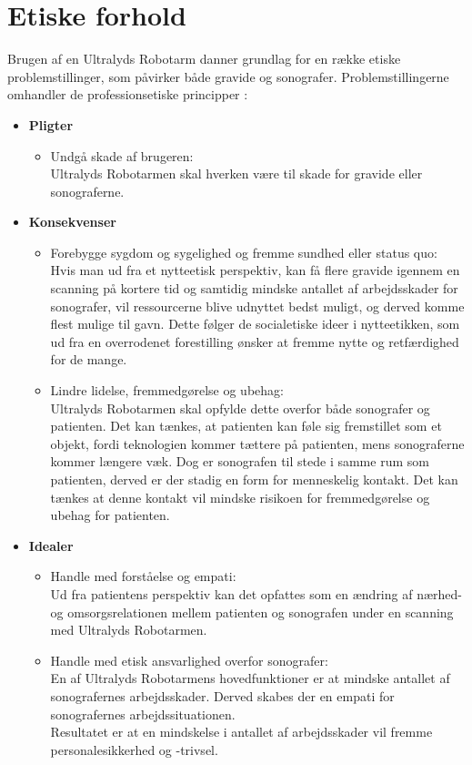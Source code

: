 \section{Etiske forhold}
Brugen af en Ultralyds Robotarm danner grundlag for en række etiske problemstillinger, som påvirker både gravide og sonografer. 
Problemstillingerne omhandler de professionsetiske principper \cite{Husted}: 
\begin{itemize}
	\item \textbf{Pligter}
	\begin{itemize}
		\item Undgå skade af brugeren:\\ 
		Ultralyds Robotarmen skal hverken være til skade for gravide eller sonograferne. 
	\end{itemize} 
	\item \textbf{Konsekvenser}
	\begin{itemize}
		\item Forebygge sygdom og sygelighed og fremme sundhed eller status quo: \\
		Hvis man ud fra et nytteetisk perspektiv, kan få flere gravide igennem en scanning på kortere tid og samtidig mindske antallet af arbejdsskader for sonografer, vil ressourcerne blive udnyttet bedst muligt, og derved komme flest mulige til gavn. Dette følger de socialetiske ideer i nytteetikken, som ud fra en overrodenet forestilling ønsker at fremme nytte og retfærdighed for de mange.    
		\item Lindre lidelse, fremmedgørelse og ubehag:\\
		Ultralyds Robotarmen skal opfylde dette overfor både sonografer og patienten. Det kan tænkes, at patienten kan føle sig fremstillet som et objekt, fordi teknologien kommer tættere på patienten, mens sonograferne kommer længere væk. Dog er sonografen til stede i samme rum som patienten, derved er der stadig en form for menneskelig kontakt. Det kan tænkes at denne kontakt vil mindske risikoen for fremmedgørelse og ubehag for patienten.   
	\end{itemize}
	\item \textbf{Idealer}
	\begin{itemize}
		\item Handle med forståelse og empati:\\
		Ud fra patientens perspektiv kan det opfattes som en ændring af nærhed- og omsorgsrelationen mellem patienten og sonografen under en scanning med Ultralyds Robotarmen. 
		\item Handle med etisk ansvarlighed overfor sonografer:\\
		En af Ultralyds Robotarmens hovedfunktioner er at mindske antallet af sonografernes arbejdsskader. Derved skabes der en empati for sonografernes arbejdssituationen.\\
		Resultatet er at en mindskelse i antallet af arbejdsskader vil fremme personalesikkerhed og -trivsel.   		
	\end{itemize} 
\end{itemize} 

